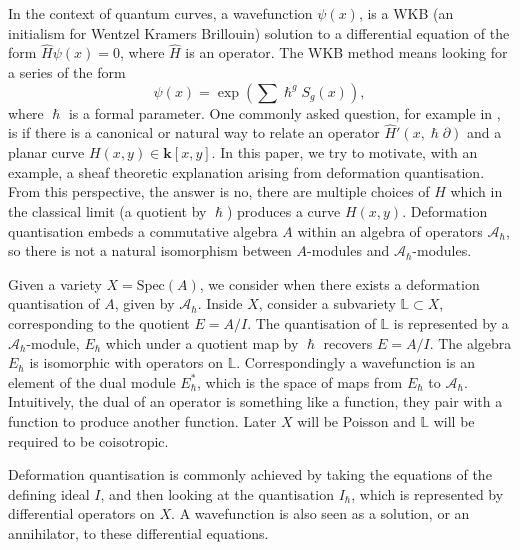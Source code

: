     In the context of quantum curves, a wavefunction \( \psi(x) \), is a WKB (an initialism for Wentzel Kramers Brillouin) solution to a differential equation of the form \( \widehat{H} \psi(x) = 0\), where \(\widehat{H}\) is an operator. The WKB method means looking for a series of the form \[ \psi(x) = \exp\left( \sum \hslash^g S_g(x) \right),\] where \(\hslash\) is a formal parameter. One commonly asked question, for example in \cite{norbury_quant, tudor,abpolyquant}, is if there is a canonical or natural way to relate an operator \( \widehat{H}'(x , \hslash \partial) \) and a planar curve \(H(x,y) \in \mathbf{k}[x,y]\). In this paper, we try to motivate, with an example, a sheaf theoretic explanation arising from deformation quantisation. From this perspective, the answer is no, there are multiple choices of \( \widehat{H}\) which in the classical limit (a quotient by \(\hslash\)) produces a curve \( H(x,y)\). Deformation quantisation embeds a commutative algebra \(A\) within an algebra of operators \( \mathcal{A}_\hslash \), so there is not a natural isomorphism between \( A\)-modules and \( \mathcal{A}_{\hslash}\)-modules. %
    
    Given a variety \(X= \mathrm{Spec}(A)\), we consider when there exists a deformation quantisation of \(A\), given by \(\mathcal{A}_{\hslash}\). Inside \(X\), consider a subvariety \( \mathbb{L} \subset X\), corresponding to the quotient \(E=A/I\). The quantisation of \( \mathbb{L}\) is represented by a \(\mathcal{A}_{\hslash}\)-module, \(E_\hslash\) which under a quotient map by \(\hslash\) recovers \(E=A/I\). The algebra \( E_{\hslash}\) is isomorphic with operators on \( \mathbb{L}\).
    Correspondingly a wavefunction is an element of the dual module \(E_\hslash^*\), which is the space of maps from \(E_\hslash\) to  \(\mathcal{A}_{\hslash} \). Intuitively, the dual of an operator is something like a function, they pair with a function to produce another function. Later \(X\) will be Poisson and \( \mathbb{L}\) will be required to be coisotropic.
    
    Deformation quantisation is commonly achieved by taking the equations of the defining ideal \(I\), and then looking at the quantisation \(I_{\hslash}\), which is represented by differential operators on \(X\). A wavefunction is also seen as a solution, or an annihilator, to these differential equations.
    
    
